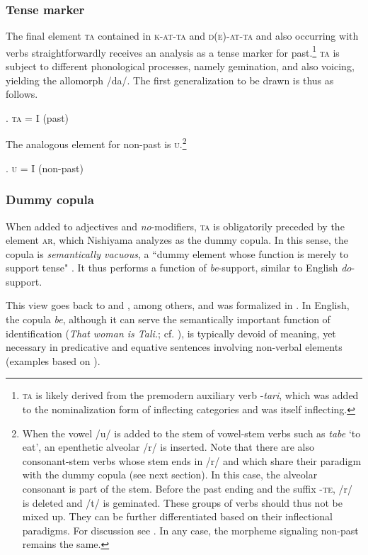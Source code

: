 \subsubsection{Tense marker}

The final element \textsc{ta} contained in \textsc{k-at-ta} and \textsc{d(e)-at-ta} and also occurring with verbs straightforwardly receives an analysis as a tense marker for past.\footnote{\textsc{ta} is likely derived from the premodern auxiliary verb -\textit{tari}, which was added to the nominalization form of inflecting categories and was itself inflecting.} \textsc{ta} is subject to different phonological processes, namely gemination, and also voicing, yielding the allomorph /da/. The first generalization to be drawn is thus as follows.

\ex. \textsc{ta} = \textsc{I} (past)

The analogous element for non-past is \textsc{u}.\footnote{When the vowel /u/ is added to the stem of vowel-stem verbs such as \textit{tabe} `to eat’, an epenthetic alveolar /r/ is inserted. Note that there are also consonant-stem verbs whose stem ends in /r/ and which share their paradigm with the dummy copula (see next section). In this case, the alveolar consonant is part of the stem. Before the past ending and the suffix -\textsc{te}, /r/ is deleted and /t/ is geminated. These groups of verbs should thus not be mixed up. They can be further differentiated based on their inflectional paradigms. For discussion see \citet[364–365]{ito:2015:word}. In any case, the morpheme signaling non-past remains the same.}

\ex. \textsc{u} = \textsc{I} (non-past)

\subsubsection{Dummy copula}

When added to adjectives and \textit{no}-modifiers, \textsc{ta} is obligatorily preceded by the element \textsc{ar}, which Nishiyama analyzes as the dummy copula. In this sense, the copula is \textit{semantically vacuous}, a ``dummy element whose function is merely to support tense" \citep[187]{nishiyama:1999:adj}. It thus performs a function of \textit{be}-support, similar to English \textit{do}-support. 

This view goes back to \citet{bach:1967:have} and \citet{doron:1983:verbless}, among others, and was formalized in \citet{rapoport:1987:copular}. In  English, the copula \textit{be}, although it can serve the semantically important function of identification (\textit{That woman is Tali.}; cf. \citealt[150]{rapoport:1987:copular}), is typically devoid of meaning, yet necessary in predicative and equative sentences involving non-verbal elements (examples based on \citealt[156]{rapoport:1987:copular}).

